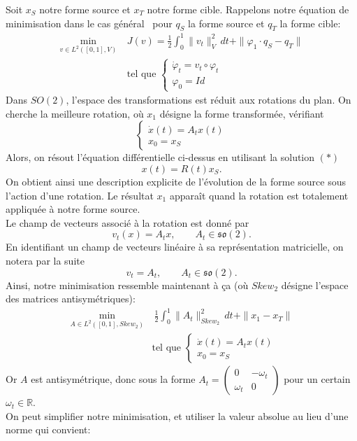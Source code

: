 \documentclass[12pt]{report}
\begin{document}
Soit $x_S$ notre forme source et $x_T$ notre forme cible. Rappelons notre équation de minimisation dans le cas général~\cite{Pol18} pour $q_S$ la forme source et $q_T$ la forme cible:
\[
\begin{aligned}
\min_{v\in L^2([0,1],V)}~&J(v)=\frac{1}{2}\int_{0}^{1}\|v_t\|_{V}^2\,dt+\|\varphi_1\cdot q_S-q_T\|\\
&\text{tel que }\left\{\begin{array}{ll}\dot{\varphi}_t=v_t\circ\varphi_t\\\varphi_0=Id\end{array}\right.
\end{aligned}
\]
Dans $SO(2)$, l'espace des transformations est réduit aux rotations du plan. On cherche la meilleure rotation, où $x_1$ désigne la forme transformée, vérifiant
\[
\left\{\begin{array}{ll}\dot{x}(t)=A_{t}x(t)\\x_0=x_S\end{array}\right.
\]
Alors, on résout l'équation différentielle ci-dessus en utilisant la solution $(*)$
\[
x(t)=R(t)x_S.
\]
On obtient ainsi une description explicite de l'évolution de la forme source sous l'action d'une rotation. Le résultat $x_1$ apparaît quand la rotation est totalement appliquée à notre forme source.\\
Le champ de vecteurs associé à la rotation est donné par
\[
v_t(x)=A_{t}x, \qquad A_t\in\mathfrak{so}(2).
\]
En identifiant un champ de vecteurs linéaire à sa représentation matricielle, on notera par la suite
\[
v_t=A_t, \qquad A_t\in\mathfrak{so}(2).
\]
Ainsi, notre minimisation ressemble maintenant à ça (où $Skew_2$ désigne l'espace des matrices antisymétriques):
\[
\begin{aligned}
\min_{A\in L^2([0,1],Skew_2)}&~\frac{1}{2}\int_{0}^{1}\|A_t\|_{Skew_2}^2\,dt+\|x_1-x_T\|\\
&\text{tel que }\left\{\begin{array}{ll}\dot{x}(t)=A_{t}x(t)\\x_0=x_S\end{array}\right.
\end{aligned}
\]
Or $A$ est antisymétrique, donc sous la forme $A_t=\begin{pmatrix}0 &-\omega_t\\ \omega_t &0\end{pmatrix}$ pour un certain $\omega_t\in\mathbb{R}$.\\
On peut simplifier notre minimisation, et utiliser la valeur absolue au lieu d'une norme qui convient:
\end{document}
